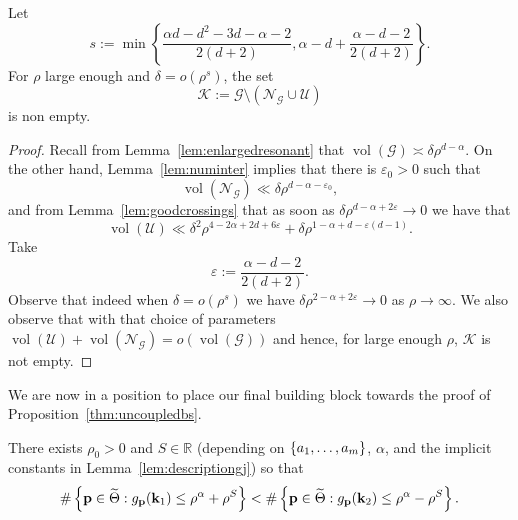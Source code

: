 \documentclass[10pt]{amsart}
\theoremstyle{definition}\newtheorem{defi}[theo]{Definition}\newtheorem{rema}[theo]{Remark}\newtheorem{exam}[theo]{Example}\newtheorem{nota}[theo]{Notation}
\DeclareMathOperator{\vol}{vol}
\newcommand{\R}{\mathbb R}
\newcommand{\CG}{\mathcal{G}}
\newcommand{\CK}{\mathcal{K}}
\newcommand{\CN}{\mathcal{N}}
\newcommand{\CU}{\mathcal{U}}
\newcommand{\bk}{\mathbf k}
\newcommand{\bp}{\mathbf p}
\newcommand{\eps}{\varepsilon}
\newcommand{\smallo}[1]{o\left(#1 \right)}
\newcommand{\set}[1]{\left\{ #1 \right\}}
\let\oldtilde\tilde
\renewcommand*{\tilde}[1]{\mathchoice{\widetilde{#1}}{\widetilde{#1}}{\oldtilde{#1}}{\oldtilde{#1}}}
\begin{document}
\begin{prop}\label{prop:overlap}
Let
\begin{equation}\label{eq:propoverlap}
s := \min \set{\frac{\alpha d - d^2 - 3d - \alpha - 2}{2(d+2)}, \alpha - d + \frac{\alpha - d - 2}{2(d+2)}}.
\end{equation}
For $\rho$ large enough and $\delta = \smallo{\rho^s}$, the set
\[
\CK:= \CG \setminus(\CN_\CG \cup \CU)
\]
is non empty.
\end{prop}
\begin{proof}
Recall from Lemma~\ref{lem:enlargedresonant} that $\vol(\CG) \asymp \delta
\rho^{d-\alpha}$. On the other hand, Lemma~\ref{lem:numinter} implies that there is $\eps_0 > 0$ such that
\begin{equation}
\vol(\CN_\CG) \ll \delta\rho^{d- \alpha - \eps_0},
\end{equation}
and from Lemma~\ref{lem:goodcrossings} that as soon as $\delta \rho^{d -
\alpha + 2 \eps} \to 0$ we have that
\begin{equation}
\vol(\CU) \ll \delta^2 \rho^{4 - 2 \alpha + 2 d + 6 \eps} + \delta \rho^{1 - \alpha + d - \eps(d-1)}.
\end{equation}
Take
\begin{equation}\label{eq:freefixed}
\eps := \frac{\alpha - d - 2}{2(d+2)}.
\end{equation}
Observe that indeed when $\delta = \smallo{\rho^s}$ we have $\delta \rho^{2 - \alpha + 2 \eps} \to 0$ as $\rho \to \infty$. We also observe that with that choice of parameters $\vol(\CU) + \vol(\CN_\CG) =
\smallo{\vol(\CG)}$ and hence, for large enough $\rho$, $\CK$ is not empty.
\end{proof}

We are now in a position to place our final building block towards the proof of Proposition~\ref{thm:uncoupledbs}.

\begin{prop}
There exists $\rho_0 > 0$ and $S \in \R$ (depending on $\{a_1,\dotsc,\linebreak a_m\}$, $\alpha$, and the implicit constants in Lemma~\ref{lem:descriptiongj}) so that
\begin{equation}\label{eq:countinggj}
\#\set{\bp \in \tilde \Theta : g_\bp(\bk_1) \le \rho^\alpha + \rho^S} <
\# \set{\bp \in \tilde \Theta : g_\bp(\bk_2) \le \rho^\alpha - \rho^S}.
\end{equation}
\end{prop}
\end{document}
